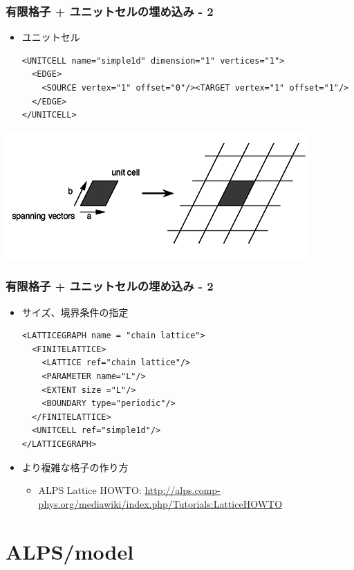 \begin{frame}[t, fragile]
  \frametitle{有限格子 + ユニットセルの埋め込み - 2}
  \begin{itemize}
  \item ユニットセル
  \begin{lstlisting}
<UNITCELL name="simple1d" dimension="1" vertices="1">
  <EDGE>
    <SOURCE vertex="1" offset="0"/><TARGET vertex="1" offset="1"/>
  </EDGE>
</UNITCELL>
\end{lstlisting}
  \end{itemize}
  \begin{center}
    \includegraphics[height=0.3\textheight]{TutorialLatticeHOWTOLattice1}
  \end{center}
\end{frame}

\begin{frame}[t,fragile]
  \frametitle{有限格子 + ユニットセルの埋め込み - 2}
  \begin{itemize}
  \item サイズ、境界条件の指定
    \begin{lstlisting}
<LATTICEGRAPH name = "chain lattice">
  <FINITELATTICE>
    <LATTICE ref="chain lattice"/>
    <PARAMETER name="L"/>
    <EXTENT size ="L"/>
    <BOUNDARY type="periodic"/>
  </FINITELATTICE>
  <UNITCELL ref="simple1d"/>
</LATTICEGRAPH>
\end{lstlisting}
  \item より複雑な格子の作り方
    \begin{itemize}
    \item ALPS Lattice HOWTO: \url{http://alps.comp-phys.org/mediawiki/index.php/Tutorials:LatticeHOWTO}
    \end{itemize}
  \end{itemize}
\end{frame}

\section{ALPS/model}

